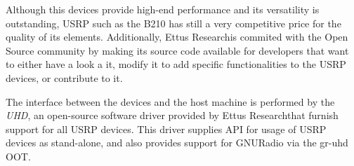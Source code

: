 Although this devices provide high-end performance and its versatility is outstanding, \ac{USRP} such as the B210 has still a very competitive price for the quality of its elements. Additionally, Ettus Research\texttrademark is commited with the Open Source community by making its source code available for developers that want to either have a look a it, modify it to add specific functionalities to the \ac{USRP} devices, or contribute to it.

The interface between the devices and the host machine is performed by the \emph{\ac{UHD}}, an open-source software driver provided by Ettus Research\texttrademark that furnish support for all \ac{USRP} devices. This driver supplies API for usage of \ac{USRP} devices as stand-alone, and also provides support for GNURadio via the gr-uhd \ac{OOT}.

